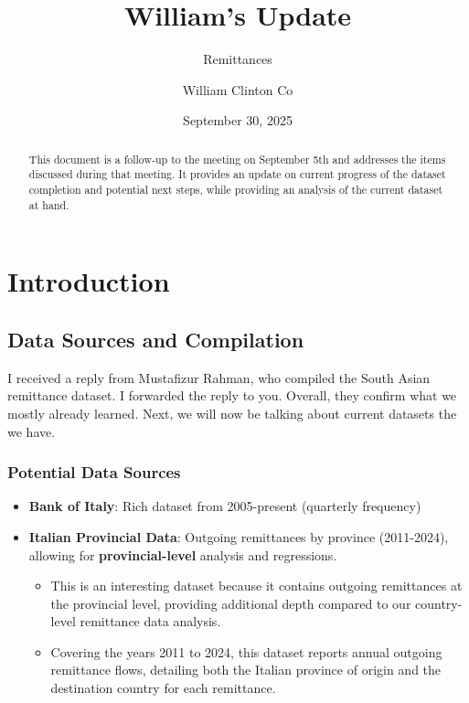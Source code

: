 \documentclass[
  11pt,
]{article}
\title{William's Update}
\subtitle{Remittances}
\author{William Clinton Co}
\date{September 30, 2025}
\providecommand{\tightlist}{%
  \setlength{\itemsep}{0pt}\setlength{\parskip}{0pt}}\usepackage{longtable,booktabs,array}
\renewcommand*\contentsname{Table of contents}
\newcommand\contentsname{Table of contents}
\begin{document}
\maketitle
\begin{abstract}
This document is a follow-up to the meeting on September 5th and
addresses the items discussed during that meeting. It provides an update
on current progress of the dataset completion and potential next steps,
while providing an analysis of the current dataset at hand.
\end{abstract}

\renewcommand*\contentsname{Table of contents}
{
\hypersetup{linkcolor=}
\setcounter{tocdepth}{10}
\tableofcontents
}
\section{Introduction}\label{introduction}

\subsection{Data Sources and
Compilation}\label{data-sources-and-compilation}

I received a reply from Mustafizur Rahman, who compiled the South Asian
remittance dataset. I forwarded the reply to you. Overall, they confirm
what we mostly already learned. Next, we will now be talking about
current datasets the we have.

\subsubsection{Potential Data Sources}\label{potential-data-sources}

\begin{itemize}
\tightlist
\item
  \textbf{Bank of Italy}: Rich dataset from 2005-present (quarterly
  frequency)
\item
  \textbf{Italian Provincial Data}: Outgoing remittances by province
  (2011-2024), allowing for \textbf{provincial-level} analysis and
  regressions.

  \begin{itemize}
  \tightlist
  \item
    This is an interesting dataset because it contains outgoing
    remittances at the provincial level, providing additional depth
    compared to our country-level remittance data analysis.
  \item
    Covering the years 2011 to 2024, this dataset reports annual
    outgoing remittance flows, detailing both the Italian province of
    origin and the destination country for each remittance.
  \end{itemize}
\end{itemize}
\end{document}
